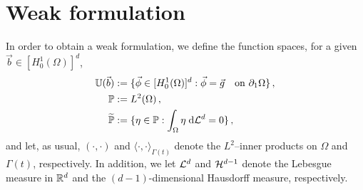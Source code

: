 \section{Weak formulation}\label{sec:stokes_weak}
In order to obtain a weak formulation, we define the function spaces, for a
given $\vec b \in [H^1_0(\Omega)]^d$,
\begin{align*}
\mathbb{U}(\vec{b}) &:= \{\vec \phi\in[H^1_0(\Omega)]^d:\vec \phi =\vec
g\quad \mbox{on }\partial_1\Omega\}\,,\\
\mathbb{P} &:= L^2(\Omega)\,,\\
\widetilde{\mathbb{P}} &:= \{\eta\in\mathbb{P} : \int_\Omega\eta\;{\rm d}{\cal L}^{d}=0 \}\,,
\end{align*}
and let, as usual, $(\cdot,\cdot)$ and $\langle \cdot, \cdot
\rangle_{\Gamma(t)}$ denote the $L^2$--inner products on $\Omega$ and
$\Gamma(t)$, respectively. In addition, we let $\mathcal{L}^d$ and $\mathcal{H}^{d-1}$ denote the
Lebesgue measure in $\mathbb R^d$ and the $(d-1)$-dimensional Hausdorff measure,
respectively.

